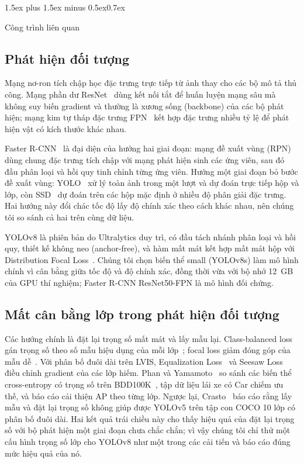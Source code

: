 \documentclass[10pt,journal,letterpaper]{IEEEtran}
\makeatletter
\renewcommand\section{\@startsection{section}{1}{\z@}%
  {1.5ex plus 1.5ex minus 0.5ex}{0.7ex}{\normalfont\scshape\raggedright}}
\makeatother
\begin{document}
\section{Công trình liên quan}
\subsection{Phát hiện đối tượng}
Mạng nơ-ron tích chập học đặc trưng trực tiếp từ ảnh thay cho các bộ mô tả thủ công. Mạng phần dư ResNet~\cite{resnet} dùng kết nối tắt để huấn luyện mạng sâu mà không suy biến gradient và thường là xương sống (backbone) của các bộ phát hiện; mạng kim tự tháp đặc trưng FPN~\cite{fpn} kết hợp đặc trưng nhiều tỷ lệ để phát hiện vật có kích thước khác nhau.

Faster R-CNN~\cite{frcnn} là đại diện của hướng hai giai đoạn: mạng đề xuất vùng (RPN) dùng chung đặc trưng tích chập với mạng phát hiện sinh các ứng viên, sau đó đầu phân loại và hồi quy tinh chỉnh từng ứng viên. Hướng một giai đoạn bỏ bước đề xuất vùng: YOLO~\cite{yolo} xử lý toàn ảnh trong một lượt và dự đoán trực tiếp hộp và lớp, còn SSD~\cite{ssd} dự đoán trên các hộp mặc định ở nhiều độ phân giải đặc trưng. Hai hướng này đổi chác tốc độ lấy độ chính xác theo cách khác nhau, nên chúng tôi so sánh cả hai trên cùng dữ liệu.

YOLOv8 là phiên bản do Ultralytics duy trì, có đầu tách nhánh phân loại và hồi quy, thiết kế không neo (anchor-free), và hàm mất mát kết hợp mất mát hộp với Distribution Focal Loss~\cite{yolov8docs}. Chúng tôi chọn biến thể small (YOLOv8s) làm mô hình chính vì cân bằng giữa tốc độ và độ chính xác, đồng thời vừa với bộ nhớ 12~GB của GPU thí nghiệm; Faster R-CNN ResNet50-FPN là mô hình đối chứng.

\subsection{Mất cân bằng lớp trong phát hiện đối tượng}
Các hướng chính là đặt lại trọng số mất mát và lấy mẫu lại. Class-balanced loss gán trọng số theo số mẫu hiệu dụng của mỗi lớp~\cite{cbloss}; focal loss giảm đóng góp của mẫu dễ~\cite{focal}. Với phân bố đuôi dài trên LVIS, Equalization Loss~\cite{eql} và Seesaw Loss~\cite{seesaw} điều chỉnh gradient của các lớp hiếm. Phan và Yamamoto~\cite{phan} so sánh các biến thể cross-entropy có trọng số trên BDD100K~\cite{bdd}, tập dữ liệu lái xe có Car chiếm ưu thế, và báo cáo cải thiện AP theo từng lớp. Ngược lại, Crasto~\cite{crasto} báo cáo rằng lấy mẫu và đặt lại trọng số không giúp được YOLOv5 trên tập con COCO 10 lớp có phân bố đuôi dài. Hai kết quả trái chiều này cho thấy hiệu quả của đặt lại trọng số với bộ phát hiện một giai đoạn chưa chắc chắn; vì vậy chúng tôi chỉ thử một cấu hình trọng số lớp cho YOLOv8 như một trong các cải tiến và báo cáo đúng mức hiệu quả của nó.
\end{document}
